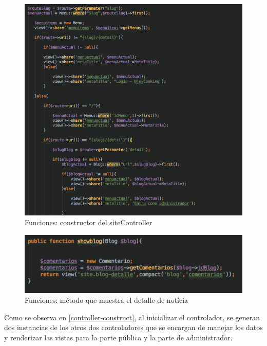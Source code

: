 \begin{figure}
\begin{center}
\includegraphics[width=1.0\textwidth]{imagenes/site-construct.png}
\caption{Funciones: constructor del siteController}
\label{site-construct}
\end{center}
\end{figure}

\begin{figure}
\begin{center}
\includegraphics[width=1.0\textwidth]{imagenes/site-showblog.png}
\caption{Funciones: método que muestra el detalle de notícia}
\label{site-showblog}
\end{center}
\end{figure}

Como se observa en \ref{controller-construct}, al inicializar el controlador, se generan dos instancias de los otros dos controladores que se encargan de
manejar los datos y renderizar las vistas para la parte pública y la parte de administrador.

